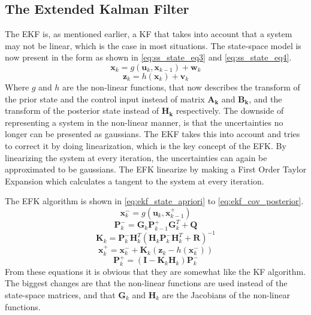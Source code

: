 \documentclass[Main]{subfiles}
\begin{document}
\subsection{The Extended Kalman Filter}
The EKF is, as mentioned earlier, a KF that takes into account that a system may not be linear, which is the case in most situations.
The state-space model is now present in the form as shown in \autoref{eq:ss_state_eq3} and \autoref{eq:ss_state_eq4}.
\begin{equation}
\label{eq:ss_state_eq3}
\mathbf{x}_k = g(\mathbf{u}_k,\mathbf{x}_{k-1}) + \mathbf{w}_k
\end{equation}
\begin{equation}
\label{eq:ss_state_eq4}
\mathbf{z}_k = h(\mathbf{x}_k) + \mathbf{v}_k
\end{equation}
Where $g$ and $h$ are the non-linear functions, that now describes the transform of the prior state and the control input instead of matrix $\mathbf{A_k}$ and $\mathbf{B_k}$, and the transform of the posterior state instead of $\mathbf{H_k}$ respectively.
The downside of representing a system in the non-linear manner, is that the uncertainties no longer can be presented as gaussians.
The EKF takes this into account and tries to correct it by doing linearization, which is the key concept of the EFK.
By linearizing the system at every iteration, the uncertainties can again be approximated to be gaussians.
The EFK linearize by making a First Order Taylor Expansion which calculates a tangent to the system at every iteration.

The EFK algorithm is shown in \autoref{eq:ekf_state_apriori} to \autoref{eq:ekf_cov_posterior}.
\begin{equation}
\label{eq:ekf_state_apriori}
\mathbf{x}_k^- = g(\mathbf{u}_k,\mathbf{x}_{k-1}^+) 
\end{equation}
\begin{equation}
\mathbf{P}_k^- = \mathbf{G}_k \mathbf{P}_{k-1}^+ \mathbf{G}_k^T+\mathbf{Q}
\end{equation}
\begin{equation}
\mathbf{K}_k = \mathbf{P}_k^- \mathbf{H}_k^T (\mathbf{H}_k \mathbf{P}_k^- \mathbf{H}_k^T + \mathbf{R})^{-1}
\end{equation}
\begin{equation}
\mathbf{x}_k^+ = \mathbf{x}_k^- + \mathbf{K}_k (\mathbf{z}_k - h(\mathbf{x}_k^-))
\end{equation}
\begin{equation}
\label{eq:ekf_cov_posterior}
\mathbf{P}_k^+ = (\mathbf{I} - \mathbf{K}_k \mathbf{H}_k) \mathbf{P}_k^-
\end{equation}
From these equations it is obvious that they are somewhat like the KF algorithm.
The biggest changes are that the non-linear functions are used instead of the state-space matrices, and that $\mathbf{G}_k$ and $\mathbf{H}_k$ are the Jacobians of the non-linear functions.

\end{document}
